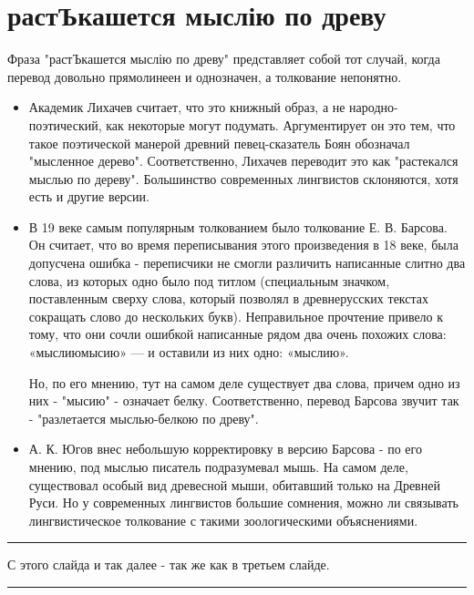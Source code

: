 \documentclass[14pt, a4paper]{article}
\newcommand{\descr}[1]
{\par\noindent\rule{0.5\textwidth}{0.4pt} \par {\large #1} \par\noindent\rule{0.5\textwidth}{0.4pt}}
\begin{document}
{\section{растЪкашется мыслію по древу}
\par Фраза "растЪкашется мыслію по древу" представляет собой тот случай, когда перевод довольно прямолинеен и однозначен, а толкование непонятно.
\begin{itemize}
  \item Академик Лихачев считает, что это книжный образ, а не народно-поэтический, как некоторые могут подумать. Аргументирует он это тем, что такое поэтической манерой древний певец-сказатель Боян обозначал "мысленное дерево". Соответственно, Лихачев переводит это как "растекался мыслью по дереву". Большинство современных лингвистов склоняются, хотя есть и другие версии.
  \item В 19 веке самым популярным толкованием было толкование Е. В. Барсова. Он считает, что во время переписывания этого произведения в 18 веке, была допусчена ошибка - переписчики не смогли различить написанные слитно два слова, из которых одно было под титлом (специальным значком, поставленным сверху слова, который позво­лял в древнерусских текстах сокращать слово до нескольких букв). Неправильное прочтение привело к тому, что они сочли ошибкой написанные рядом два очень похожих слова: «мыслиюмысию» — и оставили из них одно: «мыслию».
  \par Но, по его мнению, тут на самом деле существует два слова, причем одно из них - "мысию" - означает белку. Соответственно, перевод Барсова звучит так - "разлетается мыслью-белкою по древу".
  \item А. К. Югов внес небольшую корректировку в версию Барсова - по его мнению, под мыслью писатель подразумевал мышь. На самом деле, существовал особый вид древесной мыши, обитавший только на Древней Руси. Но у современных лингвистов большие сомнения, можно ли связывать лингвистическое толкование с такими зоологическими объяснениями.
\end{itemize}
\descr{
С этого слайда и так далее - так же как в третьем слайде.}

}
\end{document}
